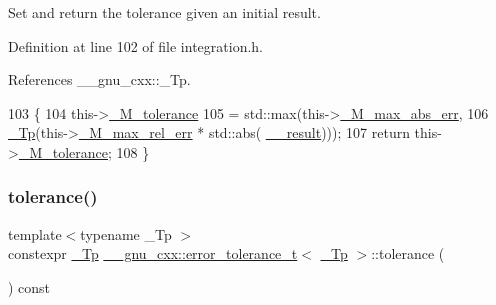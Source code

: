 Set and return the tolerance given an initial result. 



Definition at line 102 of file integration.\+h.



References \+\_\+\+\_\+gnu\+\_\+cxx\+::\+\_\+\+Tp.


\begin{DoxyCode}
103         \{
104           this->\hyperlink{struct____gnu__cxx_1_1error__tolerance__t_a261304757b9ff28304ee94d67405b2a6}{\_M\_tolerance}
105                   = std::max(this->\hyperlink{struct____gnu__cxx_1_1error__tolerance__t_a55773fc8e99f5906ba9a2b2f03a141fb}{\_M\_max\_abs\_err},
106                              \hyperlink{namespace____gnu__cxx_a3b19a9c800ca194374ef9172290f7d79}{\_Tp}(this->\hyperlink{struct____gnu__cxx_1_1error__tolerance__t_add7d7bfa6c6f5c36f50dde1497486e9e}{\_M\_max\_rel\_err} * std::abs(
      \hyperlink{namespace____gnu__cxx_a500ea9f53aeaecd8c2ae657503450578}{\_\_result})));
107           \textcolor{keywordflow}{return} this->\hyperlink{struct____gnu__cxx_1_1error__tolerance__t_a261304757b9ff28304ee94d67405b2a6}{\_M\_tolerance};
108         \}
\end{DoxyCode}
\mbox{\label{struct____gnu__cxx_1_1error__tolerance__t_a938a772fb23ee5e7476dc9fba9a2d750}} 
\subsubsection{\texorpdfstring{tolerance()}{tolerance()}\hspace{0.1cm}{\footnotesize\ttfamily [2/2]}}
{\footnotesize\ttfamily template$<$typename \+\_\+\+Tp $>$ \\
constexpr \hyperlink{namespace____gnu__cxx_a3b19a9c800ca194374ef9172290f7d79}{\+\_\+\+Tp} \hyperlink{struct____gnu__cxx_1_1error__tolerance__t}{\+\_\+\+\_\+gnu\+\_\+cxx\+::error\+\_\+tolerance\+\_\+t}$<$ \hyperlink{namespace____gnu__cxx_a3b19a9c800ca194374ef9172290f7d79}{\+\_\+\+Tp} $>$\+::tolerance (\begin{DoxyParamCaption}{ }\end{DoxyParamCaption}) const\hspace{0.3cm}{\ttfamily [inline]}}



